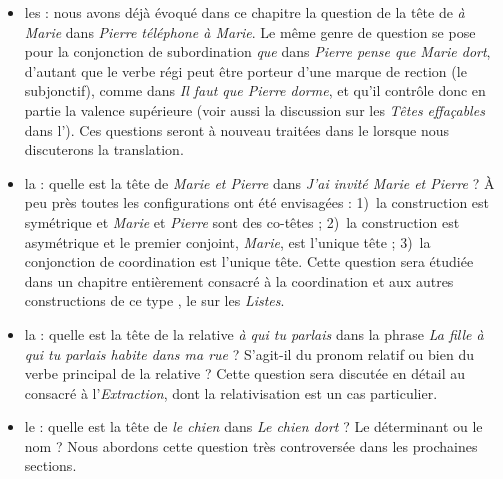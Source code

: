 \begin{itemize}
\item les : nous avons déjà évoqué dans ce chapitre la question de la tête de \textit{à Marie} dans \textit{Pierre téléphone à Marie}. Le même genre de question se pose pour la conjonction de subordination \textit{que} dans \textit{Pierre pense que Marie dort}, d’autant que le verbe régi peut être porteur d’une marque de rection (le subjonctif), comme dans \textit{Il faut que Pierre dorme}, et qu’il contrôle donc en partie la valence supérieure (voir aussi la discussion sur les \textit{Têtes effaçables} dans l’). Ces questions seront à nouveau traitées dans le  lorsque nous discuterons la translation.
\item la : quelle est la tête de \textit{Marie et Pierre} dans \textit{J’ai invité Marie et Pierre} ? À peu près toutes les configurations ont été envisagées : 1)~la construction est symétrique et \textit{Marie} et \textit{Pierre} sont des co-têtes ; 2)~la construction est asymétrique et le premier conjoint, \textit{Marie}, est l’unique tête ; 3)~la conjonction de coordination est l’unique tête. Cette question sera étudiée dans un chapitre entièrement consacré à la coordination et aux autres constructions de ce type , le  sur les \textit{Listes}.
\item la : quelle est la tête de la relative \textit{à qui tu parlais} dans la phrase \textit{La fille à qui tu parlais habite dans ma rue} ? S’agit-il du pronom relatif ou bien du verbe principal de la relative ? Cette question sera discutée en détail au  consacré à l’\textit{Extraction}, dont la relativisation est un cas particulier.
\item le : quelle est la tête de \textit{le chien} dans \textit{Le chien dort} ? Le déterminant ou le nom ? Nous abordons cette question très controversée dans les prochaines sections.
\end{itemize}

